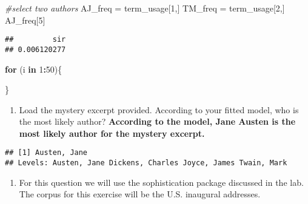\documentclass[]{article}
\newenvironment{Shaded}{\begin{snugshade}}{\end{snugshade}}
\newcommand{\KeywordTok}[1]{\textcolor[rgb]{0.13,0.29,0.53}{\textbf{#1}}}
\newcommand{\DecValTok}[1]{\textcolor[rgb]{0.00,0.00,0.81}{#1}}
\newcommand{\StringTok}[1]{\textcolor[rgb]{0.31,0.60,0.02}{#1}}
\newcommand{\CommentTok}[1]{\textcolor[rgb]{0.56,0.35,0.01}{\textit{#1}}}
\newcommand{\ControlFlowTok}[1]{\textcolor[rgb]{0.13,0.29,0.53}{\textbf{#1}}}
\newcommand{\OperatorTok}[1]{\textcolor[rgb]{0.81,0.36,0.00}{\textbf{#1}}}
\newcommand{\NormalTok}[1]{#1}
\providecommand{\tightlist}{%
  \setlength{\itemsep}{0pt}\setlength{\parskip}{0pt}}
\begin{document}
\begin{Shaded}
\begin{Highlighting}[]
\CommentTok{#select two authors}
\NormalTok{AJ_freq =}\StringTok{ }\NormalTok{term_usage[}\DecValTok{1}\NormalTok{,]}
\NormalTok{TM_freq =}\StringTok{ }\NormalTok{term_usage[}\DecValTok{2}\NormalTok{,]}
\NormalTok{AJ_freq[}\DecValTok{5}\NormalTok{]}
\end{Highlighting}
\end{Shaded}

\begin{verbatim}
##         sir 
## 0.006120277
\end{verbatim}

\begin{Shaded}
\begin{Highlighting}[]
\ControlFlowTok{for}\NormalTok{ (i }\ControlFlowTok{in} \DecValTok{1}\OperatorTok{:}\DecValTok{50}\NormalTok{)\{}
  
\NormalTok{\} }
\end{Highlighting}
\end{Shaded}

\begin{enumerate}
\def\labelenumi{(\alph{enumi})}
\setcounter{enumi}{5}
\tightlist
\item
  Load the mystery excerpt provided. According to your fitted model, who
  is the most likely author? \textbf{According to the model, Jane Austen
  is the most likely author for the mystery excerpt. }
\end{enumerate}

\begin{Shaded}
\end{Shaded}

\begin{verbatim}
## [1] Austen, Jane
## Levels: Austen, Jane Dickens, Charles Joyce, James Twain, Mark
\end{verbatim}

\begin{enumerate}
\def\labelenumi{\arabic{enumi}.}
\setcounter{enumi}{5}
\tightlist
\item
  For this question we will use the sophistication package discussed in
  the lab. The corpus for this exercise will be the U.S. inaugural
  addresses.
\end{enumerate}
\end{document}
